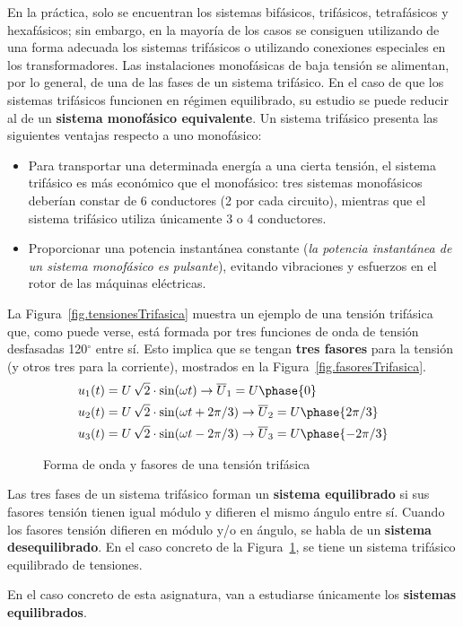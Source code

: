 \documentclass[11pt]{book} %
\numberwithin{dummy}{section}
\theoremstyle{ocrenumbox}
\theoremstyle{blacknumex}
\theoremstyle{blacknumbox}
\theoremstyle{ocrenum}
\newenvironment{remark}{\par\vspace{10pt}\small %
\begin{list}{}{
\leftmargin=35pt %
\rightmargin=25pt}\item\ignorespaces %
\makebox[-2.5pt]{\begin{tikzpicture}[overlay]
\node[draw=ocre!60,line width=1pt,circle,fill=ocre!25,font=\sffamily\bfseries,inner sep=2pt,outer sep=0pt] at (-15pt,0pt){\textcolor{ocre}{N}};\end{tikzpicture}} %
\advance\baselineskip -1pt}{\end{list}\vskip5pt} %
\newlength\esp
\begin{document}
	En la práctica, solo se encuentran los sistemas bifásicos, trifásicos, tetrafásicos y hexafásicos; sin embargo, en la mayoría de los casos se consiguen utilizando de una forma adecuada los sistemas trifásicos o utilizando conexiones especiales en los transformadores. Las instalaciones monofásicas de baja tensión se alimentan, por lo general, de una de las fases de un sistema trifásico. En el caso de que los sistemas trifásicos funcionen en régimen equilibrado, su estudio se puede reducir al de un \textbf{sistema monofásico equivalente}. Un sistema trifásico presenta las siguientes ventajas respecto a uno monofásico:
	\begin{itemize}
		\item Para transportar una determinada energía a una cierta tensión, el sistema trifásico es más económico que el monofásico: tres sistemas monofásicos deberían constar de 6 conductores (2 por cada circuito), mientras que el sistema trifásico utiliza únicamente 3 o 4 conductores.
		\item Proporcionar una potencia instantánea constante (\emph{la potencia instantánea de un sistema monofásico es pulsante}), evitando vibraciones y esfuerzos en el rotor de las máquinas eléctricas.
	\end{itemize}
	La Figura~\ref{fig.tensionesTrifasica} muestra un ejemplo de una tensión trifásica que, como puede verse, está formada por tres funciones de onda de tensión desfasadas 120$^\circ$ entre sí. Esto implica que se tengan \textbf{tres fasores} para la tensión (y otros tres para la corriente), mostrados en la Figura~\ref{fig.fasoresTrifasica}. 
	\begin{align*}
		u_1(t) &= U\,\sqrt{2}\cdot \sin(\omega t)\rightarrow  \overline{U}_1 = U\phase{0}\\
		u_2(t) &= U\,\sqrt{2} \cdot\sin(\omega t + 2\pi/3) \rightarrow  \overline{U}_2 = U\phase{2\pi/3}\\
		u_3(t) &= U\,\sqrt{2}\cdot \sin(\omega t - 2\pi/3) \rightarrow  \overline{U}_3 = U\phase{-2\pi/3}
	\end{align*}
	\begin{figure}
		\centering
		 \hfill
		\caption{Forma de onda y fasores de una tensión trifásica}
		\label{fig.tensiontrifasica}
	\end{figure}
	
	Las tres fases de un sistema trifásico forman un \textbf{sistema equilibrado} si sus fasores tensión tienen igual módulo y difieren el mismo ángulo entre sí. Cuando los fasores tensión difieren en módulo
	y/o en ángulo, se habla de un \textbf{sistema desequilibrado}. En el caso concreto de la Figura~\ref{fig.tensiontrifasica}, se tiene un sistema trifásico equilibrado de tensiones. 
	\begin{remark}
		En el caso concreto de esta asignatura, van a estudiarse únicamente los \textbf{sistemas equilibrados}.
	\end{remark}
	
\end{document}
